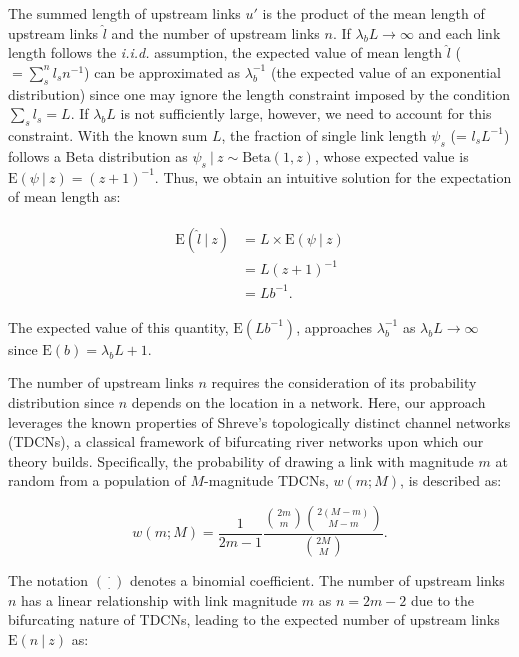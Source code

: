 \documentclass[11pt, class=article, crop=false]{standalone}
\begin{document}
The summed length of upstream links $u'$ is the product of the mean length of upstream links $\hat{l}$ and the number of upstream links $n$.
If $\lambda_b L \rightarrow \infty$ and each link length follows the \textit{i.i.d.} assumption, the expected value of mean length $\hat{l}$ ($= \sum_s^n l_s n^{-1}$) can be approximated as $\lambda_b^{-1}$ (the expected value of an exponential distribution) since one may ignore the length constraint imposed by the condition $\sum_s l_s = L$.
If $\lambda_b L$ is not sufficiently large, however, we need to account for this constraint.
With the known sum $L$, the fraction of single link length $\psi_s$ (= $l_s L^{-1}$) follows a Beta distribution as $\psi_s ~|~ z \sim \mbox{Beta}(1, z)$, whose expected value is $\mbox{E}(\psi~|~z) = (z + 1)^{-1}$.
Thus, we obtain an intuitive solution for the expectation of mean length as:

\begin{align}
    \begin{split}
    \mbox{E}(\hat{l}~|~z) &= L \times \mbox{E}(\psi~|~z)\\
                          &= L(z + 1)^{-1}\\
                          &= Lb^{-1}.
    \end{split}
\end{align}

The expected value of this quantity, $\mbox{E}(Lb^{-1})$, approaches $\lambda_b^{-1}$ as $\lambda_b L \rightarrow \infty$ since $\mbox{E}(b) = \lambda_b L + 1$.

The number of upstream links $n$ requires the consideration of its probability distribution since $n$ depends on the location in a network.
Here, our approach leverages the known properties of Shreve's topologically distinct channel networks (TDCNs), a classical framework of bifurcating river networks upon which our theory builds.
Specifically, the probability of drawing a link with magnitude $m$ at random from a population of $M$-magnitude TDCNs, $w(m; M)$, is described as:

\begin{equation}
    w(m; M) = \frac{1}{2m - 1} \frac{\binom{2m}{m} \binom{2(M - m)}{M - m}}{\binom{2M}{M}}.
\end{equation}

The notation $\binom{\cdot}{\cdot}$ denotes a binomial coefficient.
The number of upstream links $n$ has a linear relationship with link magnitude $m$ as $n = 2m - 2$ due to the bifurcating nature of TDCNs, leading to the expected number of upstream links $\mbox{E}(n~|~z)$ as:
\end{document}
